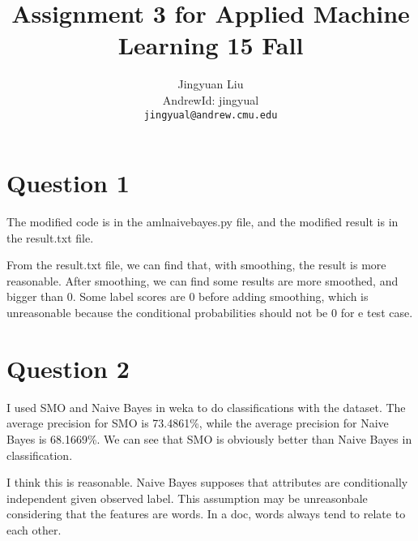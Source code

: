\documentclass{article} %
\title{Assignment 3 for Applied Machine Learning 15 Fall}
\author{
Jingyuan Liu\\
AndrewId: jingyual\\
\texttt{jingyual@andrew.cmu.edu} \\
}
\begin{document}
\maketitle



\section{Question 1}
The modified code is in the amlnaivebayes.py file, and the modified result
is in the result.txt file.

From the result.txt file, we can find that, with smoothing, the result is more
reasonable. After smoothing, we can find some results are more smoothed, and
bigger than 0. Some label scores are 0 before adding smoothing, which is
unreasonable because the conditional probabilities should not be 0 for e test
case.



\section{Question 2}
I used SMO and Naive Bayes in weka to do classifications with the dataset. The
average precision for SMO is 73.4861\%, while the average precision for Naive
Bayes is 68.1669\%. We can see that SMO is obviously better than Naive Bayes in
classification.

I think this is reasonable. Naive Bayes supposes that attributes are
conditionally independent given observed label. This assumption may be
unreasonbale considering that the features are words. In a doc, words always
tend to relate to each other.
\end{document}
